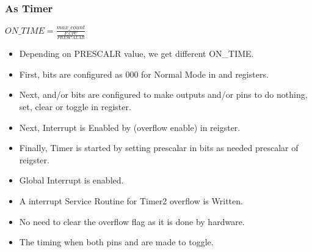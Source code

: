 \subsubsection{As Timer}
\begin{center}
    $ON\_TIME = \frac{max\_count}{\frac{F\_CPU}{PRESCALAR}}$
\end{center}
\begin{itemize}
    \item Depending on PRESCALR value, we get different ON\_TIME.
    \item First,  bits are configured as 000 for Normal Mode in  and  registers.
    \item Next,  and/or  bits are configured to make outputs  and/or  pins to do nothing, set, clear or toggle in  register.
    \item Next, Interrupt is Enabled by  (overflow enable) in  reigster.
    \item Finally, Timer is started by setting prescalar in  bits as needed prescalar of  reigster.
    \item Global Interrupt is enabled.
    \item A interrupt Service Routine for Timer2 overflow is Written.
    \item No need to clear the overflow flag as it is done by hardware.
    \item The timing when both pins  and  are made to toggle.
\end{itemize}

